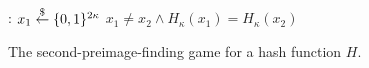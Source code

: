 \begin{figure}[t]
  \begin{algorithm}[H]
    \caption{\label{alg.2preimage-game} The second-preimage-finding
            game for a hash function $H$.}
    \begin{algorithmic}[1]
      :
          \State $x_1 \overset{\$}{\gets} \{0,1\}^{2\kappa}$
          \State \Return $x_1 \neq x_2 \wedge H_\kappa(x_1) = H_\kappa(x_2)$
      \EndFunction
    \end{algorithmic}
\end{algorithm}
\end{figure}
